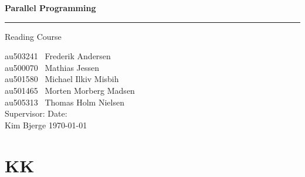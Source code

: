 \documentclass[12px,oz]{report}
\begin{document}
	

\thispagestyle{empty}
	\begin{titlepage}
		\centering
		\vspace*{3\baselineskip}
		{\Huge \bfseries Parallel Programming}
		\rule{\linewidth}{0.5mm}
		\LARGE
		Reading Course
		\\
		\null\vfill
		\begin{flushleft} \large
			au503241 \hspace*{2em} \  Frederik Andersen\\
			au500070 \hspace*{2em} \  Mathias Jessen\\
			au501580 \hspace*{2em} \  Michael Ilkiv Misbih\\
			au501465 \hspace*{2em} \  Morten Morberg Madsen\\
			au505313 \hspace*{2em} \  Thomas Holm Nielsen\\
			\vspace{100pt}
			Supervisor:\hspace{94pt}  Date: \\
			Kim Bjerge \hspace{90pt}  \today\\
		\end{flushleft}
		\vspace*{6\baselineskip}
	\end{titlepage}
	\thispagestyle{empty}
\clearpage
\setcounter{page}{1}

\chapter{KK}

\cite{PANDA}



\end{document}
